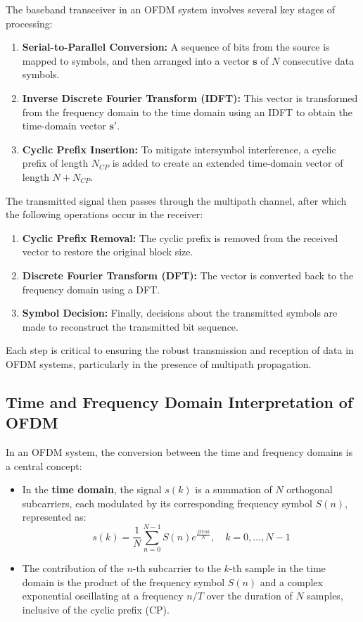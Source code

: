 The baseband transceiver in an OFDM system involves several key stages of processing:

\begin{enumerate}
    \item \textbf{Serial-to-Parallel Conversion:} A sequence of bits from the source is mapped to symbols, and then arranged into a vector \(\mathbf{s}\) of \(N\) consecutive data symbols.
    \item \textbf{Inverse Discrete Fourier Transform (IDFT):} This vector is transformed from the frequency domain to the time domain using an IDFT to obtain the time-domain vector \(\mathbf{s}'\).
    \item \textbf{Cyclic Prefix Insertion:} To mitigate intersymbol interference, a cyclic prefix of length \(N_{CP}\) is added to create an extended time-domain vector of length \(N + N_{CP}\).
\end{enumerate}

The transmitted signal then passes through the multipath channel, after which the following operations occur in the receiver:

\begin{enumerate}
    \item \textbf{Cyclic Prefix Removal:} The cyclic prefix is removed from the received vector to restore the original block size.
    \item \textbf{Discrete Fourier Transform (DFT):} The vector is converted back to the frequency domain using a DFT.
    \item \textbf{Symbol Decision:} Finally, decisions about the transmitted symbols are made to reconstruct the transmitted bit sequence.
\end{enumerate}

Each step is critical to ensuring the robust transmission and reception of data in OFDM systems, particularly in the presence of multipath propagation.




\subsection*{Time and Frequency Domain Interpretation of OFDM}

In an OFDM system, the conversion between the time and frequency domains is a central concept:

\begin{itemize}
    \item In the \textbf{time domain}, the signal \(s(k)\) is a summation of \(N\) orthogonal subcarriers, each modulated by its corresponding frequency symbol \(S(n)\), represented as:
    \begin{equation}
        s(k) = \frac{1}{N} \sum_{n=0}^{N-1} S(n) e^{\frac{j2\pi nk}{N}}, \quad k = 0, \ldots, N - 1
    \end{equation}
    \item The contribution of the \(n\)-th subcarrier to the \(k\)-th sample in the time domain is the product of the frequency symbol \(S(n)\) and a complex exponential oscillating at a frequency \(n/T\) over the duration of \(N\) samples, inclusive of the cyclic prefix (CP).
\end{itemize}

